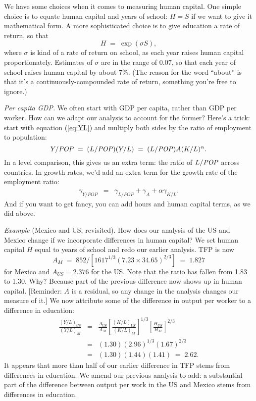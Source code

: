 \documentclass[letterpaper,12pt]{article}
\newcommand{\POP}{\mbox{\em POP\/}}
\begin{document}
We have some choices when it comes to measuring human capital.
One simple choice is to equate human capital and years of school:
$H = S$ if we want to give it mathematical form.
A more sophisticated choice is to give education a rate of return,
so that
\begin{equation}
    H \;=\; \exp( \sigma S ) ,
    \label{eq:mincer}
\end{equation}
where $\sigma$ is kind of a rate of return on school,
as each year raises human capital proportionately.
Estimates of $\sigma$ are in the range of $0.07$,
so that each year of school raises human capital by
about $7\%$.
(The reason for the word ``about'' is that it's a continuously-compounded
rate of return, something you're free to ignore.)


{\it Per capita GDP.}
We often start with GDP per capita, rather than GDP per worker.
How can we adapt our analysis to account for the former?
Here's a trick:
start with equation (\ref{eq:YL}) and multiply both sides by
the ratio of employment to population:
\[
    Y/\POP \;=\; (L/\POP) (Y/L) \;=\; (L/\POP) A (K/L)^\alpha .
\]
In a level comparison, this gives us an extra term:  the ratio
of $L/\POP$ across countries.
In growth rates, we'd add an extra term for the growth rate of
the employment ratio:
\begin{eqnarray*}
    \gamma_{Y/POP} &=&  \gamma_{L/POP}  + \gamma_A
                + \alpha \gamma_{K/L}  .
\end{eqnarray*}
And if you want to get fancy, you can add hours and human capital terms,
as we did above.


{\it Example\/} (Mexico and US, revisited).
How does our analysis of the US and Mexico change if
we incorporate differences in human capital?
We set human capital $H$ equal to years of school
and redo our earlier analysis.
TFP is now
\[
    A_M \;=\; 852 / [ 1617^{1/3} (7.23 \times 34.65)^{2/3} ] \;=\; 1.827
\]
for Mexico and $A_{US} = 2.376$ for the US.
Note that the ratio has fallen from 1.83 to 1.30.
Why?  Because part of the previous difference
now shows up in human capital.
[Reminder:  $A$ is a residual, so
any change in the analysis changes our measure of it.]
We now attribute some of the difference in output per worker
to a difference in education:
\begin{eqnarray*}
     \frac{(Y/L)_{US}}{(Y/L)_{M}}  &=&  \frac{A_{US}}{A_M}
                        \left[ \frac{(K/L)_{US}}{(K/L)_{M}} \right]^{1/3}
                        \left[ \frac{H_{US}}{H_M} \right]^{2/3}_{\phantom{X_X}}   \\
                         &=&   (1.30) (2.96)^{1/3} (1.67)^{2/3}  \\%
                         &=&   (1.30) (1.44) (1.41) \;=\; 2.62 . %
\end{eqnarray*}
It appears that more than half of our earlier difference in TFP
stems from differences in education.
We amend our previous analysis to add:
a substantial part of the difference between output per work
in the US and Mexico stems from differences in education.
\end{document}
